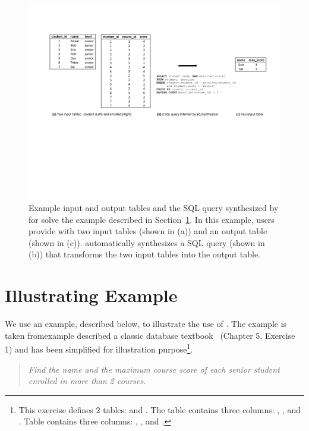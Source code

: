 
\begin{figure}[t]
  \centering
  \includegraphics[scale=0.75]{motivating}
  \vspace*{-4.0ex}\caption {{\label{fig:motivating}
  Example input and output tables and the SQL query synthesized by
  \ourtool for solve the example described in Section~\ref{sec:example}. In this example, users provide \ourtool with
  two input tables (shown in (a)) and an output table (shown in (c)).
  \ourtool automatically synthesizes a SQL query (shown in (b)) that
  transforms the two input tables into the output table.
}}
\end{figure}

\section{Illustrating Example}
\label{sec:example}

We use an example, described below, to illustrate the use
of \ourtool. The example is taken fromexample described a classic
database textbook~\cite{cowbook} (Chapter 5, Exercise 1)
and has been simplified for illustration purpose\footnote{
This exercise defines 2 tables: 
and . The  table
contains three columns: , ,
and . Table  contains
three columns: , ,
and .
}.

\begin{quote}
\textit{Find the name and the maximum course score of each senior student
enrolled in more than 2 courses.}
\end{quote}

